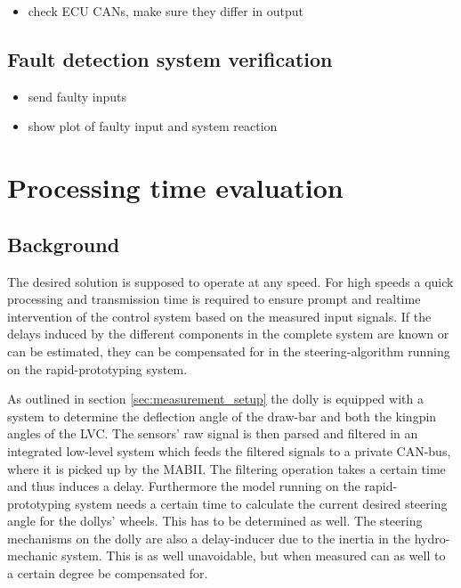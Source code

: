 \documentclass[ExampleMasters.tex]{subfiles}
\begin{document}
\begin{itemize}
	
	\item check ECU CANs, make sure they differ in output
	
\end{itemize}

\subsection{Fault detection system verification}
\label{sec:fault_detect_test}

\begin{itemize}
	\item send faulty inputs
	\item show plot of faulty input and system reaction
	
\end{itemize}
\section{Processing time evaluation}
\label{chap:processing_time_delay}
\subsection{Background}
The desired solution is supposed to operate at any speed. For high speeds a quick processing and transmission time is required to ensure prompt and realtime intervention of the control system based on the measured input signals. If the delays induced by the different components in the complete system are known or can be estimated, they can be compensated for in the steering-algorithm running on the rapid-prototyping system.

As outlined in section \ref{sec:measurement_setup} the dolly is equipped with a system to determine the deflection angle of the draw-bar and both the kingpin angles of the LVC. The sensors' raw signal is then parsed and filtered in an integrated low-level system which feeds the filtered signals to a private CAN-bus, where it is picked up by the MABII. The filtering operation takes a certain time and thus induces a delay. Furthermore the model running on the rapid-prototyping system needs a certain time to calculate the current desired steering angle for the dollys' wheels. This has to be determined as well. The steering mechanisms on the dolly are also a delay-inducer due to the inertia in the hydro-mechanic system. This is as well unavoidable, but when measured can as well to a certain degree be compensated for. 
\end{document}
